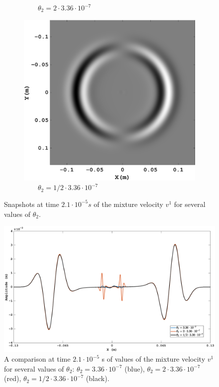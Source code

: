 \documentclass[3p,times,table]{article}
\begin{document}
\begin{figure}[!htbp]
\begin{subfigure}{0.3\linewidth}
\caption{$ \quad\quad \theta_2=2\cdot3.36\cdot10^{-7} $}
\end{subfigure}%
\hfill
\begin{subfigure}{0.3\linewidth}
\includegraphics[draft=false,width=1\textwidth]{Figures/Xi_31_new}
\caption{$ \quad\quad \theta_2=1/2\cdot3.36\cdot10^{-7} $}
\end{subfigure}%
\caption{Snapshots at time $2.1\cdot10^{-5}s$ of the mixture velocity $v^1$ for several values of $ \theta_2 $.}
\label{fig:compare_friction}
\end{figure}
\begin{figure}[!htbp]
	\begin{center}
		\includegraphics[draft=false,width=1.0\textwidth]{Figures/Compare_Xi_1}
	\end{center}
	\caption{A comparison at time $2.1\cdot10^{-5}$ s of values of the mixture velocity 
	$v^1$ for several values of $ \theta_2 $: $ \theta_2 
	=3.36\cdot10^{-7}$ (blue), $ \theta_2=2 \cdot 3.36\cdot10^{-7} $ (red), $ 
	\theta_2=1/2 \cdot 3.36\cdot10^{-7} $ (black).}
	\label{fig:compare_friction_line}
\end{figure}
\end{document}
